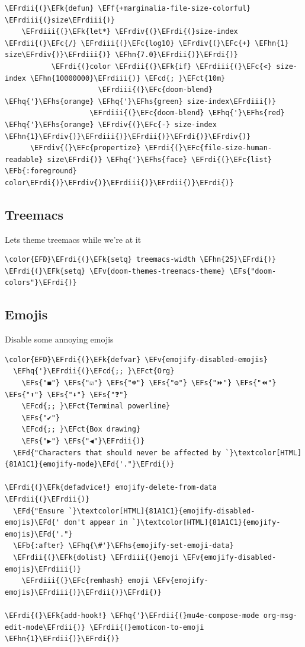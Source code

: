 \documentclass{scrartcl}
\newcommand{\EFk}[1]{\textcolor{EFk}{#1}} %
\newcommand{\EFd}[1]{\textcolor{EFd}{#1}} %
\newcommand{\EFs}[1]{\textcolor{EFs}{#1}} %
\newcommand{\EFb}[1]{\textcolor{EFb}{#1}} %
\newcommand{\EFct}[1]{\textcolor{EFct}{#1}} %
\newcommand{\EFc}[1]{\textcolor{EFc}{#1}} %
\newcommand{\EFv}[1]{\textcolor{EFv}{#1}} %
\newcommand{\EFf}[1]{\textcolor{EFf}{#1}} %
\newcommand{\EFcd}[1]{\textcolor{EFcd}{#1}} %
\newcommand{\EFhn}[1]{#1} %
\newcommand{\EFhq}[1]{#1} %
\newcommand{\EFhs}[1]{#1} %
\newcommand{\EFrdi}[1]{#1} %
\newcommand{\EFrdii}[1]{#1} %
\newcommand{\EFrdiii}[1]{#1} %
\newcommand{\EFrdiv}[1]{#1} %
\begin{document}
\begin{Code}
\begin{Verbatim}[]
  \EFrdii{(}\EFk{defun} \EFf{+marginalia-file-size-colorful} \EFrdiii{(}size\EFrdiii{)}
    \EFrdiii{(}\EFk{let*} \EFrdiv{(}\EFrdi{(}size-index \EFrdii{(}\EFc{/} \EFrdiii{(}\EFc{log10} \EFrdiv{(}\EFc{+} \EFhn{1} size\EFrdiv{)}\EFrdiii{)} \EFhn{7.0}\EFrdii{)}\EFrdi{)}
           \EFrdi{(}color \EFrdii{(}\EFk{if} \EFrdiii{(}\EFc{<} size-index \EFhn{10000000}\EFrdiii{)} \EFcd{; }\EFct{10m}
                      \EFrdiii{(}\EFc{doom-blend} \EFhq{'}\EFhs{orange} \EFhq{'}\EFhs{green} size-index\EFrdiii{)}
                    \EFrdiii{(}\EFc{doom-blend} \EFhq{'}\EFhs{red} \EFhq{'}\EFhs{orange} \EFrdiv{(}\EFc{-} size-index \EFhn{1}\EFrdiv{)}\EFrdiii{)}\EFrdii{)}\EFrdi{)}\EFrdiv{)}
      \EFrdiv{(}\EFc{propertize} \EFrdi{(}\EFc{file-size-human-readable} size\EFrdi{)} \EFhq{'}\EFhs{face} \EFrdi{(}\EFc{list} \EFb{:foreground} color\EFrdi{)}\EFrdiv{)}\EFrdiii{)}\EFrdii{)}\EFrdi{)}
\end{Verbatim}
\end{Code}

\subsection{Treemacs}
\label{sec:orged54611}
Lets theme treemacs while we're at it
\begin{Code}
\begin{Verbatim}[]
\color{EFD}\EFrdi{(}\EFk{setq} treemacs-width \EFhn{25}\EFrdi{)}
\EFrdi{(}\EFk{setq} \EFv{doom-themes-treemacs-theme} \EFs{"doom-colors"}\EFrdi{)}
\end{Verbatim}
\end{Code}

\subsection{Emojis}
\label{sec:org8a0465f}
Disable some annoying emojis
\begin{Code}
\begin{Verbatim}[]
\color{EFD}\EFrdi{(}\EFk{defvar} \EFv{emojify-disabled-emojis}
  \EFhq{'}\EFrdii{(}\EFcd{;; }\EFct{Org}
    \EFs{"◼"} \EFs{"☑"} \EFs{"☸"} \EFs{"⚙"} \EFs{"⏩"} \EFs{"⏪"} \EFs{"⬆"} \EFs{"⬇"} \EFs{"❓"}
    \EFcd{;; }\EFct{Terminal powerline}
    \EFs{"✔"}
    \EFcd{;; }\EFct{Box drawing}
    \EFs{"▶"} \EFs{"◀"}\EFrdii{)}
  \EFd{"Characters that should never be affected by `}\textcolor[HTML]{81A1C1}{emojify-mode}\EFd{'."}\EFrdi{)}

\EFrdi{(}\EFk{defadvice!} emojify-delete-from-data \EFrdii{(}\EFrdii{)}
  \EFd{"Ensure `}\textcolor[HTML]{81A1C1}{emojify-disabled-emojis}\EFd{' don't appear in `}\textcolor[HTML]{81A1C1}{emojify-emojis}\EFd{'."}
  \EFb{:after} \EFhq{\#'}\EFhs{emojify-set-emoji-data}
  \EFrdii{(}\EFk{dolist} \EFrdiii{(}emoji \EFv{emojify-disabled-emojis}\EFrdiii{)}
    \EFrdiii{(}\EFc{remhash} emoji \EFv{emojify-emojis}\EFrdiii{)}\EFrdii{)}\EFrdi{)}

\EFrdi{(}\EFk{add-hook!} \EFhq{'}\EFrdii{(}mu4e-compose-mode org-msg-edit-mode\EFrdii{)} \EFrdii{(}emoticon-to-emoji \EFhn{1}\EFrdii{)}\EFrdi{)}
\end{Verbatim}
\end{Code}
\end{document}
